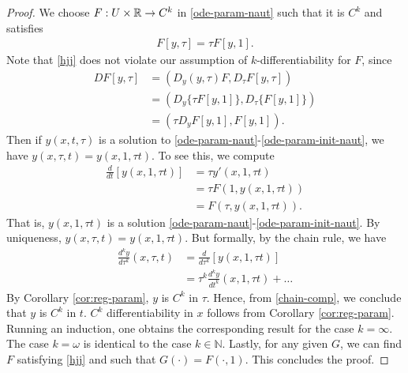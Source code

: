 \begin{proof}
  We choose $F: U \times \mathbb{R} \to C^{k}$ in \eqref{ode-param-naut}
  such that it is $C^{k}$ and satisfies 
  \begin{equation}
    \label{hjj}
  \begin{split}
    F\left[ y, \tau \right] = \tau F \left[ y, 1 \right].
  \end{split}
  \end{equation}
  Note that \eqref{hjj} does not violate our assumption of $k$-differentiability
  for $F$, since
%
%
\begin{equation*}
\begin{split}
  DF\left[ y, \tau \right]
  & = \left( D_{y}(y, \tau) F, D_{\tau} F[y, \tau] \right)
  \\
  & = (  D_{y} \{\tau F[y, 1] \}, D_{\tau} \{F[y, 1] \} ) 
  \\
  & = ( \tau D_{y} F[y, 1], F[y, 1]).
\end{split}
\end{equation*}
%
%
Then if $y(x, t, \tau)$ is a solution to
\eqref{ode-param-naut}-\eqref{ode-param-init-naut}, we have $y(x, \tau, t ) =
y(x, 1, \tau t)$. To see this, we compute
%
%
\begin{equation*}
\begin{split}
\frac{d}{dt}\left[ y(x, 1, \tau t) \right]
& = \tau y'(x, 1, \tau t)
\\
& = \tau F\left( 1, y(x, 1, \tau t) \right)
\\
& = F(\tau, y(x, 1, \tau t)).
\end{split}
\end{equation*}
%
%
That is, $y(x, 1, \tau t)$ is a solution
\eqref{ode-param-naut}-\eqref{ode-param-init-naut}. By uniqueness, $y(x, \tau, t) =
y(x, 1, \tau t)$. But formally, by the chain rule, we have
%
%
\begin{equation}
  \label{chain-comp}
\begin{split}
\frac{d^{k}y}{d \tau^{k}}(x, \tau, t) 
& = \frac{d}{d \tau^{k}}\left[ y(x, 1, \tau t) \right]
\\
& = \tau^{k} \frac{d^{k}y}{dt^{k}}(x, 1, \tau t) + \dots
\end{split}
\end{equation}
%
%
By Corollary \ref{cor:reg-param}, $y$ is $C^{k}$ in $\tau$. Hence, from
\eqref{chain-comp}, we conclude that $y$ is $C^{k}$ in $t$. $C^{k}$
differentiability in $x$ follows from Corollary \ref{cor:reg-param}.
Running an induction, one obtains the corresponding result
for the case $k = \infty$. The case $k = \omega$ is identical to the case
$k \in \mathbb{N}$. Lastly, for any given $G$,
we can find $F$ satisfying \eqref{hjj} and such that
$G(\cdot) = F(\cdot, 1)$. This concludes the proof.
%
\end{proof}
%
